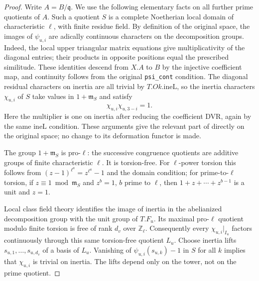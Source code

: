 \begin{proof}
Write \(A=B/\mathfrak q\). We use the following elementary facts on
all further prime quotients of \(A\). Such a quotient \(S\) is a
complete Noetherian local domain of characteristic \(\ell\), with
finite residue field. By definition of the original space, the
images of \(\psi_{u,i}\) are adically continuous characters on the
decomposition groups. Indeed, the local upper triangular matrix
equations give multiplicativity of the diagonal entries; their
products in opposite positions equal the prescribed similitude.
These identities descend from \(X.A\) to \(B\) by the injective
coefficient map, and continuity follows from the original
\texttt{psi\_cont} condition. The diagonal residual characters on
inertia are all trivial by \(T.Ok.\mathrm{ineL}\), so the inertia
characters \(\chi_{u,i}\) of \(S\) take values in \(1+\mathfrak m_S\)
and satisfy
\[
                   \chi_{u,i}\chi_{u,3-i}=1 .
\]
Here the multiplier is one on inertia after reducing the coefficient
DVR, again by the same \(\mathrm{ineL}\) condition. These arguments
give the relevant part of
 directly on
the original space; no change to its deformation functor is made.

The group \(1+\mathfrak m_S\) is pro-\(\ell\): the successive
congruence quotients are additive groups of finite characteristic
\(\ell\). It is torsion-free. For \(\ell\)-power torsion this follows
from \((z-1)^{\ell^a}=z^{\ell^a}-1\) and the domain condition; for
prime-to-\(\ell\) torsion, if \(z\equiv1\bmod\mathfrak m_S\) and
\(z^b=1\), \(b\) prime to \(\ell\), then
\(1+z+\cdots+z^{b-1}\) is a unit and \(z=1\).

Local class field theory identifies the image of inertia in the
abelianized decomposition group with the unit group of \(T.F_u\).
Its maximal pro-\(\ell\) quotient modulo finite torsion is free
of rank \(d_v\) over \(\mathbb Z_\ell\). Consequently every
\(\chi_{u,i}|_{I_u}\) factors continuously through this same
torsion-free quotient \(L_u\). Choose inertia lifts
\(s_{u,1},\dots,s_{u,d_v}\) of a basis of \(L_u\). Vanishing of
\(\psi_{u,i}(s_{u,k})-1\) in \(S\) for all \(k\) implies that
\(\chi_{u,i}\) is trivial on inertia. The lifts depend only on
the tower, not on the prime quotient.


\end{proof}
